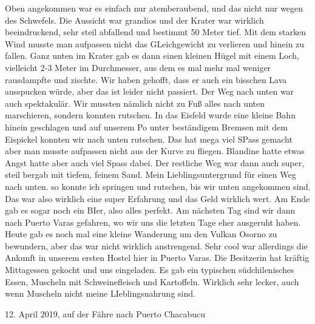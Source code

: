 \documentclass[11pt]{book}
\begin{document}
Oben angekommen war es einfach nur atemberaubend, und das nicht nur wegen des Schwefels. Die Aussicht war grandios und der Krater war 
wirklich beeindruckend, sehr steil abfallend und bestimmt 50 Meter tief. Mit dem starken Wind musste man aufpassen nicht das GLeichgewicht 
zu verlieren und hinein zu fallen. Ganz unten im Krater gab es dann einen kleinen Hügel mit einem Loch, vielleicht 2-3 Meter im Durchmesser, 
aus dem es mal mehr mal weniger rausdampfte und zischte. Wir haben gehofft, dass er auch ein bisschen Lava ausspucken würde, aber das ist 
leider nicht passiert. Der Weg nach unten war auch spektakulär. Wir mussten nämlich nicht zu Fuß alles nach unten marschieren, sondern konnten 
rutschen. In das Eisfeld wurde eine kleine Bahn hinein geschlagen und auf unserem Po unter beständigem Bremsen mit dem Eispickel konnten 
wir nach unten rutschen. Das hat mega viel SPass gemacht aber man musste aufpassen nicht aus der Kurve zu fliegen. Blandine hatte 
etwas Angst hatte aber auch viel Spass dabei. Der restliche Weg war dann auch super, steil bergab mit tiefem, feinem Sand. Mein 
Lieblingsuntergrund für einen Weg nach unten. so konnte ich springen und rutschen, bis wir unten angekommen sind. Das war also wirklich 
eine super Erfahrung und das Geld wirklich wert. Am Ende gab es sogar noch ein BIer, also alles perfekt. 
Am nächsten Tag sind wir dann nach Puerto Varas gefahren, wo wir uns die letzten Tage eher ausgeruht haben. Heute gab es noch mal eine 
kleine Wanderung um den Vulkan Osorno zu bewundern, aber das war nicht wirklich anstrengend. Sehr cool war allerdings die Ankunft 
in unserem ersten Hostel hier in Puerto Varas. Die Besitzerin hat kräftig Mittagessen gekocht und uns eingeladen. Es gab ein typischen 
südchilenisches Essen, Muscheln mit Schweinefleisch und Kartoffeln. Wirklich sehr lecker, auch wenn Muscheln nicht meine LIeblingsnahrung sind. 


12. April 2019, auf der Fähre nach Puerto Chacabucu
\end{document}

